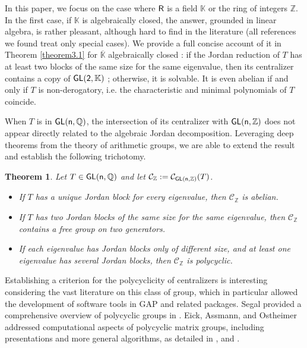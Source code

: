 \documentclass[a4paper,11pt]{article}
\newtheorem{theorem}{Theorem}[section]
\theoremstyle{definition}
\def\r{{\sf{R}}}
\newcommand{\Z}{\mathbb Z}
\newcommand{\Q}{\mathbb Q}
\newcommand{\C}{\mathcal C}
\newcommand{\K}{\mathbb K}
\def \GL{\sf{GL}}
\begin{document}
In this paper, we focus on the case where $\r$ is a field $\mathbb{K}$ or the ring of integers $\mathbb{Z}$. In the first case,  if $\K$ is algebraically closed, the answer, grounded in linear algebra, is rather pleasant, although hard to find in the literature (all references we found treat only special cases).  We provide a full concise account of it in Theorem \ref{theorem3.1} for $\overline{\K}$ algebraically closed : if the Jordan
reduction of $T$ has at least two blocks of the same size for the same eigenvalue, then its centralizer contains a copy of $\GL(2,\K)$ ; otherwise, it is solvable. It is even abelian
if and only if $T$ is non-derogatory, i.e. the characteristic and minimal polynomials of $T$
coincide.

When $T$ is in $\GL(n,\Q)$, the intersection of its centralizer with $\GL(n,\Z)$ does not appear directly related to the algebraic Jordan decomposition. Leveraging deep theorems from the theory of arithmetic groups, we are able to extend the result and establish the following trichotomy.

\begin{theorem}\label{theorem1}
Let $T \in \GL(n, \Q)$ and let $\C_{\Z}:=\C_{\GL(n,\Z)}(T)$.
\begin{itemize}
\item[\rm (a)]
If $T$ has a unique Jordan block for every eigenvalue, then $\C_{\Z}$ is abelian.
\item[\rm (b)]
If $T$ has two Jordan blocks of the same size for the same eigenvalue, then $\C_{\Z}$ contains a free group on two generators.
\item[\rm (c)]
If each eigenvalue has Jordan blocks only of different size, and at least one
eigenvalue has several Jordan blocks, then $\C_{\Z}$ is polycyclic.
\end{itemize}
\end{theorem}

Establishing a criterion for the polycyclicity of centralizers is interesting considering the vast literature on this class of group, which in particular allowed the development of software tools in GAP and related packages.
Segal provided a comprehensive overview of polycyclic groups in \cite{segal1983polycyclic}. Eick, Assmann, and Ostheimer addressed computational aspects of polycyclic matrix groups, including presentations and more general algorithms, as detailed in \cite{MR1716421} ,\cite{Assmann} and \cite{eick2022polycyclic}.
\end{document}
